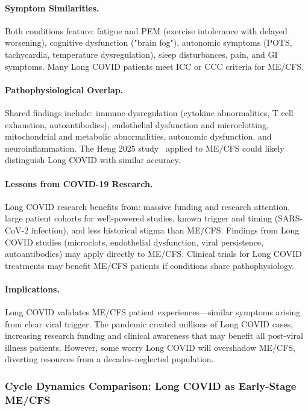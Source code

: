 \paragraph{Symptom Similarities.}
Both conditions feature: fatigue and PEM (exercise intolerance with delayed worsening), cognitive dysfunction ("brain fog"), autonomic symptoms (POTS, tachycardia, temperature dysregulation), sleep disturbances, pain, and GI symptoms. Many Long COVID patients meet ICC or CCC criteria for ME/CFS.

\paragraph{Pathophysiological Overlap.}
Shared findings include: immune dysregulation (cytokine abnormalities, T cell exhaustion, autoantibodies), endothelial dysfunction and microclotting, mitochondrial and metabolic abnormalities, autonomic dysfunction, and neuroinflammation. The Heng 2025 study~\cite{heng2025mecfs} applied to ME/CFS could likely distinguish Long COVID with similar accuracy.

\paragraph{Lessons from COVID-19 Research.}
Long COVID research benefits from: massive funding and research attention, large patient cohorts for well-powered studies, known trigger and timing (SARS-CoV-2 infection), and less historical stigma than ME/CFS. Findings from Long COVID studies (microclots, endothelial dysfunction, viral persistence, autoantibodies) may apply directly to ME/CFS. Clinical trials for Long COVID treatments may benefit ME/CFS patients if conditions share pathophysiology.

\paragraph{Implications.}
Long COVID validates ME/CFS patient experiences---similar symptoms arising from clear viral trigger. The pandemic created millions of Long COVID cases, increasing research funding and clinical awareness that may benefit all post-viral illness patients. However, some worry Long COVID will overshadow ME/CFS, diverting resources from a decades-neglected population.

\subsubsection{Cycle Dynamics Comparison: Long COVID as Early-Stage ME/CFS}
\label{subsubsec:long-covid-cycle-dynamics}

